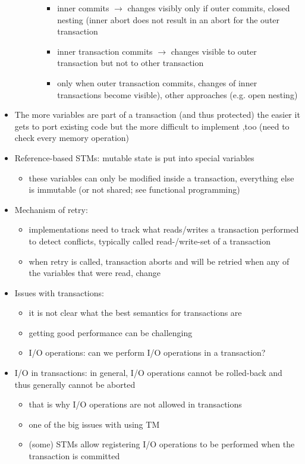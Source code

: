 \documentclass[a4paper]{article}
\begin{document}
\begin{itemize}
\begin{itemize}
\begin{enumerate}
\begin{itemize}
\item inner commits $\rightarrow$ changes visibly only if outer commits, closed nesting (inner abort does not result in an abort for the outer transaction
\item inner transaction commits $\rightarrow$ changes visible to outer transaction but not to other transaction
\item only when outer transaction commits, changes of inner transactions become visible), other approaches (e.g. open nesting)
\end{itemize}
\end{enumerate}
\end{itemize}
\item The more variables are part of a transaction (and thus protected) the easier it gets to port existing code but the more difficult to implement ,too (need to check every memory operation)
\item Reference-based STMs: mutable state is put into special variables
\begin{itemize}
\item  these variables can only be modified inside a transaction, everything else is immutable (or not shared; see functional programming)
\end{itemize}
\item Mechanism of retry: 
\begin{itemize}
\item implementations need to track what reads/writes a transaction performed to detect conflicts, typically called read-/write-set of a transaction
\item when retry is called, transaction aborts and will be retried when any of the variables that were read, change
\end{itemize}
\item Issues with transactions:
\begin{itemize}
\item it is not clear what the best semantics for transactions are
\item getting good performance can be challenging
\item I/O operations: can we perform I/O operations in a transaction?
\end{itemize}
\item I/O  in transactions: in general, I/O operations cannot be rolled-back and thus generally cannot be aborted
\begin{itemize}
\item that is why I/O operations are not allowed in transactions
\item one of the big issues with using TM
\item (some) STMs allow registering I/O operations to be performed when the transaction is committed
\end{itemize}
\end{itemize}
\end{document}

